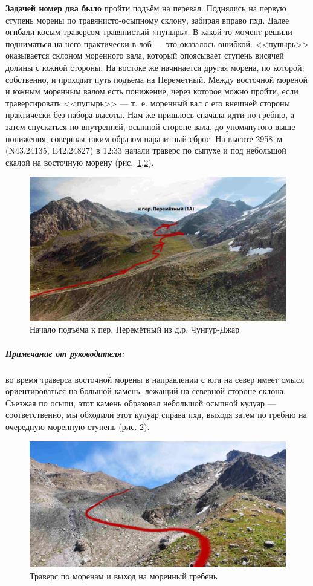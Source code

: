 \textbf{Задачей номер два было} пройти подъём на перевал. Поднялись на первую ступень морены по травянисто-осыпному склону, забирая вправо пхд. Далее огибали косым траверсом травянистый «пупырь». В какой-то момент решили подниматься на него практически в лоб --- это оказалось ошибкой: <<пупырь>> оказывается склоном моренного вала, который опоясывает ступень висячей долины с южной стороны. На востоке же начинается другая морена, по которой, собственно, и проходит путь подъёма на Перемётный. Между восточной мореной и южным моренным валом есть понижение, через которое можно пройти, если траверсировать <<пупырь>> --- т.~е. моренный вал с его внешней стороны практически без набора высоты. Нам же пришлось сначала идти по гребню, а затем спускаться по внутренней, осыпной стороне вала, до упомянутого выше понижения, совершая таким образом паразитный сброс. На высоте 2958~м (N43.24135\degree, E42.24827\degree) в 12:33  начали траверс по сыпухе и под небольшой скалой на восточную морену (рис.~\ref{fig:perem_1},\ref{fig:DSC_0280}).
\begin{figure}[h!]
	\centering
	\includegraphics[width=0.7\linewidth]{../pics/perem_1}
	\caption{Начало подъёма к пер. Перемётный из д.р. Чунгур-Джар}
	\label{fig:perem_1}
\end{figure}  

\subparagraph{Примечание от руководителя:} во время траверса восточной морены в направлении с юга на север имеет смысл ориентироваться на большой камень, лежащий на северной стороне склона. Съезжая по осыпи, этот камень образовал небольшой осыпной кулуар --- соответственно, мы обходили этот кулуар справа пхд, выходя затем по гребню на очередную моренную ступень (рис. \ref{fig:DSC_0280}).
\begin{figure}[h!]
	\centering
	\includegraphics[width=0.7\linewidth]{../pics/DSC_0280.jpg}
	\caption{Траверс по моренам и выход на моренный гребень}
	\label{fig:DSC_0280}
\end{figure}


